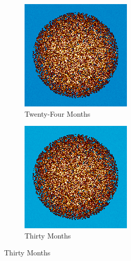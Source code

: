 \begin{figure}[H]
\begin{subfigure}{0.31\textwidth}
  \includegraphics[width=0.9\linewidth]{figures/burn-20-bstep4}
  \caption{Twenty-Four Months}
  \label{fig:bstep4}
\end{subfigure}%
%
\begin{subfigure}{0.31\textwidth}
  \includegraphics[width=0.9\linewidth]{figures/burn-20-bstep5}
  \caption{Thirty Months}
  \label{fig:bstep5}
\end{subfigure}%


\end{figure}
